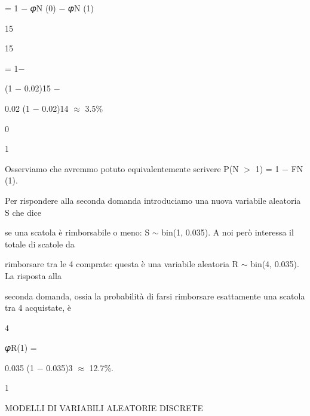 \documentclass[a4paper,portrait,12pt]{article}
\begin{document}
\begin{flushleft}
= 1 $-$ 𝜑N (0) $-$ 𝜑N (1)
\end{flushleft}


15


15


= 1$-$


(1 $-$ 0.02)15 $-$


0.02 (1 $-$ 0.02)14 $\approx$ 3.5\%


0


1


\begin{flushleft}
Osserviamo che avremmo potuto equivalentemente scrivere P(N $>$ 1) = 1 $-$ FN (1).
\end{flushleft}


\begin{flushleft}
Per rispondere alla seconda domanda introduciamo una nuova variabile aleatoria S che dice
\end{flushleft}


\begin{flushleft}
se una scatola \`{e} rimborsabile o meno: S $\sim$ bin(1, 0.035). A noi per\`{o} interessa il totale di scatole da
\end{flushleft}


\begin{flushleft}
rimborsare tra le 4 comprate: questa \`{e} una variabile aleatoria R $\sim$ bin(4, 0.035). La risposta alla
\end{flushleft}


\begin{flushleft}
seconda domanda, ossia la probabilit\`{a} di farsi rimborsare esattamente una scatola tra 4 acquistate, \`{e}
\end{flushleft}


4


\begin{flushleft}
𝜑R(1) =
\end{flushleft}


0.035 (1 $-$ 0.035)3 $\approx$ 12.7\%.


1










\begin{flushleft}
MODELLI DI VARIABILI ALEATORIE DISCRETE
\end{flushleft}
\end{document}
